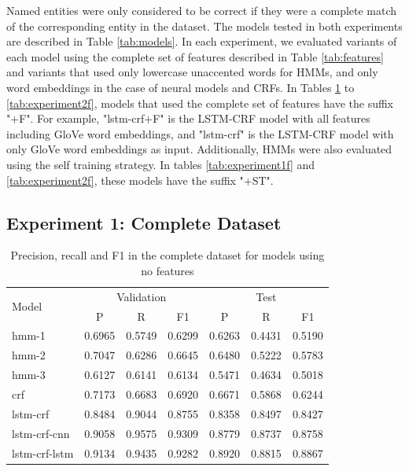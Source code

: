 \documentclass[sigconf]{acmart}
\begin{document}
Named entities were only considered to be correct if they were a complete match of the 
corresponding entity in the dataset. The models tested in both experiments are described in Table \ref{tab:models}.
In each experiment, we evaluated variants of each model using the complete set of features described in 
Table \ref{tab:features} and variants that used only lowercase unaccented words for HMMs, 
and only word embeddings in the case of neural models and CRFs. In Tables \ref{tab:experiment1} to 
\ref{tab:experiment2f}, models that used the complete set of features have the suffix "+F". For example,
"lstm-crf+F" is the LSTM-CRF model with all features including GloVe word embeddings, and "lstm-crf" is 
the LSTM-CRF model with only GloVe word embeddings as input.
Additionally, HMMs were also evaluated using the self training strategy. In tables \ref{tab:experiment1f} 
and \ref{tab:experiment2f}, these models have the suffix "+ST".

\subsection{Experiment 1: Complete Dataset}

\begin{table}[h]
  \small
  \begin{center}
    \begin{tabular}{ lllllll }
      \toprule
      \multirow{2}{*}{Model} & \multicolumn{3}{c}{Validation} & \multicolumn{3}{c}{Test} \\
                             & \multicolumn{1}{c}{P} & \multicolumn{1}{c}{R} & \multicolumn{1}{c}{F1}
                             & \multicolumn{1}{c}{P} & \multicolumn{1}{c}{R} & \multicolumn{1}{c}{F1} \\
      \midrule
      hmm-1	    & 0.6965 & 0.5749 & 0.6299 & 0.6263 & 0.4431 & 0.5190 \\
      hmm-2	    & 0.7047 & 0.6286 & 0.6645 & 0.6480 & 0.5222 & 0.5783 \\
      hmm-3	    & 0.6127 & 0.6141 & 0.6134 & 0.5471 & 0.4634 & 0.5018 \\
      crf	    & 0.7173 & 0.6683 & 0.6920 & 0.6671 & 0.5868 & 0.6244 \\
      lstm-crf	    & 0.8484 & 0.9044 & 0.8755 & 0.8358 & 0.8497 & 0.8427 \\
      lstm-crf-cnn  & 0.9058 & 0.9575 & 0.9309 & 0.8779 & 0.8737 & 0.8758 \\
      lstm-crf-lstm & 0.9134 & 0.9435 & 0.9282 & 0.8920 & 0.8815 & 0.8867 \\
      \bottomrule
    \end{tabular}
  \end{center}
  \caption{Precision, recall and F1 in the complete dataset for models using no features}
  \label{tab:experiment1}
\end{table}
\end{document}
